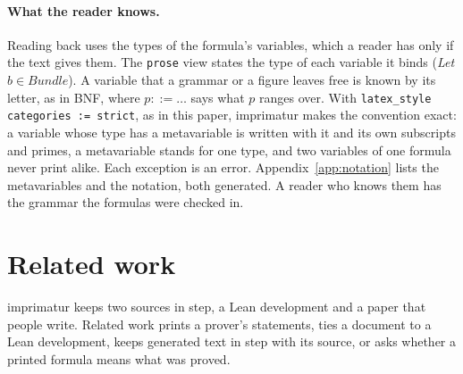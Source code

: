\documentclass[acmsmall,screen,review,anonymous,nonacm]{acmart}
\begin{document}
\paragraph{What the reader knows.} Reading back uses the types of the
formula's variables, which a reader has only if the text gives them. The
\verb|prose| view states the type of each variable it binds (\emph{Let
$b \in \mathit{Bundle}$}). A variable that a grammar or a figure leaves
free is known by its letter, as in BNF, where $p ::= \ldots$ says what $p$
ranges over. With \verb|latex_style categories := strict|, as in this
paper, imprimatur makes the convention exact: a variable whose type has a
metavariable is written with it and its own subscripts and primes, a
metavariable stands for one type, and two variables of one formula never
print alike. Each exception is an error. Appendix~\ref{app:notation} lists
the metavariables and the notation, both generated. A reader who knows
them has the grammar the formulas were checked in.

\section{Related work}\label{sec:related}

imprimatur keeps two sources in step, a Lean development and a paper that
people write. Related work prints a prover's statements, ties a document to
a Lean development, keeps generated text in step with its source, or asks
whether a printed formula means what was proved.
\end{document}
